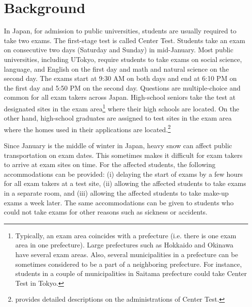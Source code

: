 \documentclass[12pt,letterpaper]{article}
\begin{document}
\section{Background}\label{sec:background}

In Japan, for admission to public universities, students are usually required to take two exams.
The first-stage test is called Center Test.
Students take an exam on consecutive two days (Saturday and Sunday) in mid-January.
Most public universities, including UTokyo, require students to take exams on social science, language, and English on the first day and math and natural science on the second day.
The exams start at 9:30 AM on both days and end at 6:10 PM on the first day and 5:50 PM on the second day.
Questions are multiple-choice and common for all exam takers across Japan.
High-school seniors take the test at designated sites in the exam area\footnote{ \label{footnote:prefecture}
  Typically, an exam area coincides with a prefecture (i.e. there is one exam area in one prefecture).
  Large prefectures such as Hokkaido and Okinawa have several exam areas.
  Also, several municipalities in a prefecture can be sometimes considered to be a part of a neighboring prefecture.
  For instance, students in a couple of municipalities in Saitama prefecture could take Center Test in Tokyo.
} where their high schools are located.
On the other hand, high-school graduates are assigned to test sites in the exam area where the homes used in their applications are located.\footnote{
  \citet{Watanabe2013} provides detailed descriptions on the administrations of Center Test.
}

Since January is the middle of winter in Japan, heavy snow can affect public transportation on exam dates.
This sometimes makes it difficult for exam takers to arrive at exam sites on time.
For the affected students, the following accommodations can be provided:
(i) delaying the start of exams by a few hours for all exam takers at a test site,
(ii) allowing the affected students to take exams in a separate room, and
(iii) allowing the affected students to take make-up exams a week later.
The same accommodations can be given to students who could not take exams for other reasons such as sickness or accidents.

\end{document}
